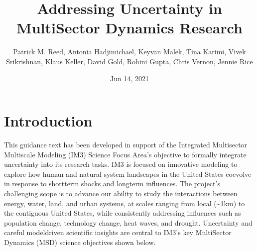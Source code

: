 \documentclass[letterpaper,10pt,english]{sphinxmanual}
\title{Addressing Uncertainty in MultiSector Dynamics Research}
\date{Jun 14, 2021}
\author{Patrick M.\@{} Reed, Antonia Hadjimichael, Keyvan Malek, Tina Karimi, Vivek Srikrishnan, Klaus Keller, David Gold, Rohini Gupta, Chris Vernon, Jennie Rice}
\begin{document}
\pagestyle{empty}
\sphinxmaketitle
\pagestyle{plain}
\sphinxtableofcontents
\pagestyle{normal}
\label{\detokenize{index::doc}}



\chapter{Introduction}
\label{\detokenize{1_introduction:introduction}}\label{\detokenize{1_introduction:id1}}\label{\detokenize{1_introduction::doc}}
\sphinxAtStartPar
This guidance text has been developed in support of the Integrated Multisector Multiscale Modeling (IM3) Science Focus Area’s objective to formally integrate uncertainty into its research tasks. IM3 is focused on innovative modeling to explore how human and natural system landscapes in the United States co\sphinxhyphen{}evolve in response to short\sphinxhyphen{}term shocks and long\sphinxhyphen{}term influences. The project’s challenging scope is to advance our ability to study the interactions between energy, water, land, and urban systems, at scales ranging from local (\textasciitilde{}1km) to the contiguous United States, while consistently addressing influences such as population change, technology change, heat waves, and drought. Uncertainty and careful model\sphinxhyphen{}driven scientific insights are central to IM3’s key MultiSector Dynamics (MSD) science objectives shown below.

\sphinxAtStartPar
{}

\sphinxAtStartPar
{}

\sphinxAtStartPar
{}

\sphinxAtStartPar
{}
\end{document}
